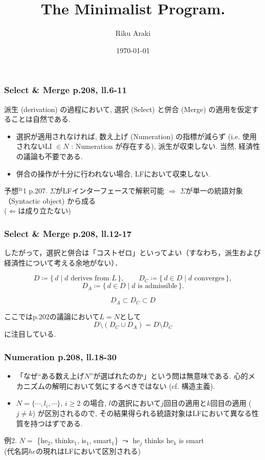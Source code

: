 \documentclass[dvipdfmx, xcolor={dvipsnames},12pt]{beamer}
\title{The Minimalist Program.}
\author{Riku Araki}
\date \today
\begin{document}
\begin{frame}

\frametitle{Select \& Merge p.208, ll.6-11}
派生 (derivation) の過程において, 選択 (Select) と併合 (Merge) の適用を仮定することは自然である.
\begin{itemize}
    \item 選択が適用されなければ, 数え上げ (Numeration) の指標が減らず (i.e. 使用されないLI $\in N$ : Numeration が存在する), 派生が収束しない. 当然, 経済性の議論も不要である.
    \item  併合の操作が十分に行われない場合, LFにおいて収束しない.
\end{itemize}
\begin{Rem}{予想$^\text{lx}$1 p.207.}
$\Sigma$がLFインターフェースで解釈可能 $\Rightarrow$ $\Sigma$が単一の統語対象 （Syntactic object) から成る\\  ($\Leftarrow$は成り立たない)
\end{Rem}

\end{frame}

\begin{frame}
\frametitle{Select \& Merge p.208, ll.12-17}

したがって，選択と併合は「コストゼロ」といってよい（すなわち，派生および経済性について考える余地がない）．

\[
D \coloneqq \{\, d \mid d \text{ derives from } L \,\},
\qquad
D_{C} \coloneqq \{\, d \in D \mid d \text{ converges} \,\}, 
\]
\[
D_{A} \coloneqq \{\, d \in D \mid d \text{ is admissible} \,\}.
\]

\[
D_{A} \subset D_{C} \subset D
\]

ここではp.202の議論において$L=N$として \[D\setminus (D_{C}\cup D_{A}) = D \setminus D_{C}\]に注目している.

\end{frame}


\begin{frame}
\frametitle{Numeration p.208, ll.18-30}
 \begin{itemize}
  \item 「なぜ``ある数え上げ$N$''が選ばれたのか」という問は無意味である. 心的メカニズムの解明において気にするべきではない (cf. 構造主義).
  \item $N = \{ \cdots, l_{i}, \cdots \}$, $i\ge 2$ の場合, $l$の選択において$j$回目の適用と$k$回目の適用 ($j\ne k$) が区別されるので, その結果得られる統語対象はLFにおいて異なる性
質を持つはずである.
\end{itemize}

\begin{Ex}{例2.}
$N =$ \{he$_{2}$, thinks$_{1}$, is$_{1}$, smart$_{1}$\} $\leadsto$ he$_{j}$ thinks he$_{k}$ is smart\\
(代名詞$\mathit{he}$の現れはLFにおいて区別される)
\end{Ex}

\end{frame}
\end{document}

